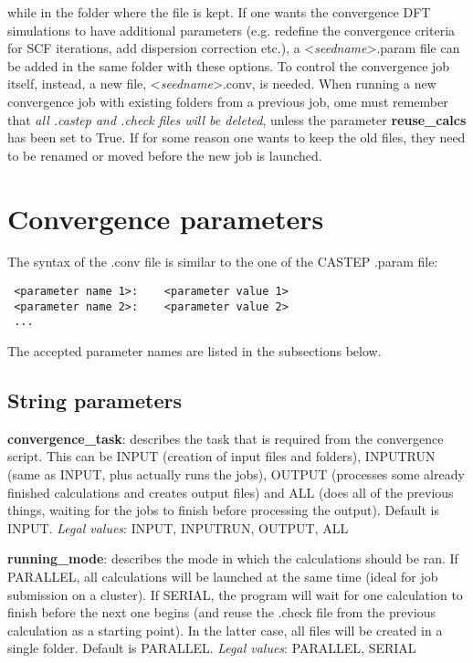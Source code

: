 \documentclass[10pt]{article}
\begin{document}
while in the folder where the file is kept. If one wants the convergence DFT simulations to have additional parameters (e.g. redefine the convergence criteria for SCF iterations, add dispersion correction etc.), a \textless \textit{seedname}\textgreater.param file can be added in the same folder with these options. To control the convergence job itself, instead, a new file, \textless \textit{seedname}\textgreater.conv, is needed.\newline
When running a new convergence job with existing folders from a previous job, ome must remember that \textit{all .castep and .check files will be deleted}, unless the parameter \textbf{reuse\_calcs} has been set to True. If for some reason one wants to keep the old files, they need to be renamed or moved before the new job is launched.

\section{Convergence parameters}

The syntax of the .conv file is similar to the one of the CASTEP .param file:

\begin{lstlisting}
 <parameter name 1>:    <parameter value 1>
 <parameter name 2>:    <parameter value 2>
 ...
\end{lstlisting}

The accepted parameter names are listed in the subsections below.

\subsection{String parameters}

\textbf{convergence\_task}: describes the task that is required from the convergence script. This can be INPUT (creation of input files and folders), INPUTRUN (same as INPUT, plus actually runs the jobs), OUTPUT (processes some already finished calculations and creates output files) and ALL (does all of the previous things, waiting for the jobs to finish before processing the output). Default is INPUT.\newline
\textit{Legal values}: INPUT, INPUTRUN, OUTPUT, ALL\newline

\textbf{running\_mode}: describes the mode in which the calculations should be ran. If PARALLEL, all calculations will be launched at the same time (ideal for job submission on a cluster). If SERIAL, the program will wait for one calculation to finish before the next one begins (and reuse the .check file from the previous calculation as a starting point). In the latter case, all files will be created in a single folder. Default is PARALLEL.\newline
\textit{Legal values}: PARALLEL, SERIAL\newline
\end{document}
